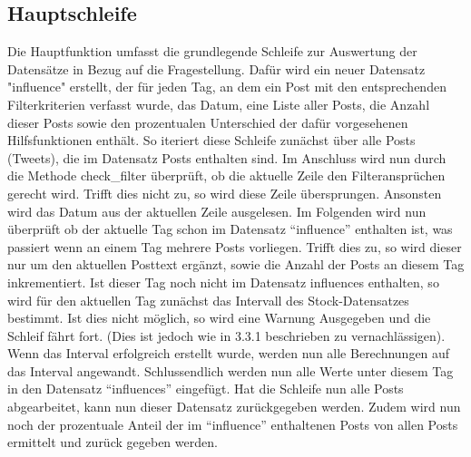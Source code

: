 \documentclass{article}
\begin{document}
\subsection{Hauptschleife}
Die Hauptfunktion umfasst die grundlegende Schleife zur Auswertung der Datensätze in Bezug auf die Fragestellung.
Dafür wird ein neuer Datensatz "influence" erstellt, der für jeden Tag, an dem ein Post mit den entsprechenden Filterkriterien verfasst wurde, das Datum, eine Liste aller Posts, die Anzahl dieser Posts sowie den prozentualen Unterschied der dafür vorgesehenen Hilfsfunktionen enthält.
So iteriert diese Schleife zunächst über alle Posts (Tweets), die im Datensatz Posts enthalten sind.
Im Anschluss wird nun durch die Methode check\_filter überprüft, ob die aktuelle Zeile den Filteransprüchen gerecht wird.
Trifft dies nicht zu, so wird diese Zeile übersprungen.
Ansonsten wird das Datum aus der aktuellen Zeile ausgelesen.
Im Folgenden wird nun überprüft ob der aktuelle Tag schon im Datensatz ``influence'' enthalten ist, was passiert wenn an einem Tag mehrere Posts vorliegen. Trifft dies zu, so wird dieser nur um den aktuellen Posttext ergänzt, sowie die Anzahl der Posts an diesem Tag inkrementiert.
Ist dieser Tag noch nicht im Datensatz influences enthalten, so wird für den aktuellen Tag zunächst das Intervall des Stock-Datensatzes bestimmt.
Ist dies nicht möglich, so wird eine Warnung Ausgegeben und die Schleif fährt fort.
(Dies ist jedoch wie in 3.3.1 beschrieben zu vernachlässigen).
Wenn das Interval erfolgreich erstellt wurde, werden nun alle Berechnungen auf das Interval angewandt.
Schlussendlich werden nun alle Werte unter diesem Tag in den Datensatz ``influences'' eingefügt.
Hat die Schleife nun alle Posts abgearbeitet, kann nun dieser Datensatz zurückgegeben werden.
Zudem wird nun noch der prozentuale Anteil der im ``influence'' enthaltenen Posts von allen Posts ermittelt und zurück gegeben werden.
\end{document}
